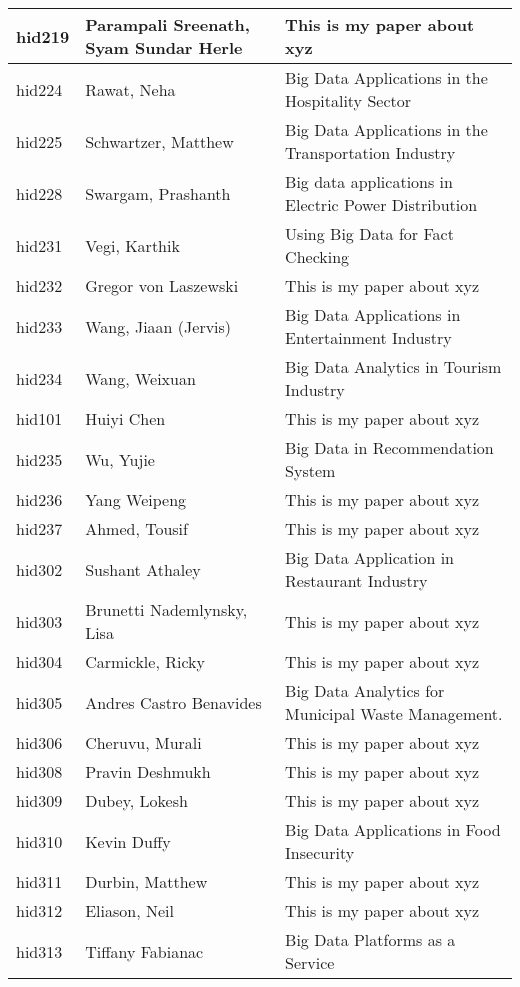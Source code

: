 \documentclass[12pt]{article}
\begin{document}
\begin{footnotesize}
\begin{longtable}{|p{1cm}p{5cm}p{9cm}|}
\hline
hid219 & Parampali Sreenath, Syam Sundar Herle & This is my paper about xyz  \\
\hline
hid224 & Rawat, Neha & Big Data Applications in the Hospitality Sector  \\
\hline
hid225 & Schwartzer, Matthew & Big Data Applications in the Transportation Industry  \\
\hline
hid228 & Swargam, Prashanth & Big data applications in Electric Power Distribution  \\
\hline
hid231 & Vegi, Karthik & Using Big Data for Fact Checking  \\
\hline
hid232 & Gregor von Laszewski & This is my paper about xyz  \\
\hline
hid233 & Wang, Jiaan (Jervis) & Big Data Applications in Entertainment Industry  \\
\hline
hid234 & Wang, Weixuan & Big Data Analytics in Tourism Industry  \\
\hline
hid101 & Huiyi Chen & This is my paper about xyz  \\
\hline
hid235 & Wu, Yujie & Big Data in Recommendation System  \\
\hline
hid236 & Yang Weipeng & This is my paper about xyz  \\
\hline
hid237 & Ahmed, Tousif & This is my paper about xyz  \\
\hline
hid302 & Sushant Athaley & Big Data Application in Restaurant Industry  \\
\hline
hid303 & Brunetti Nademlynsky, Lisa & This is my paper about xyz  \\
\hline
hid304 & Carmickle, Ricky & This is my paper about xyz  \\
\hline
hid305 & Andres Castro Benavides & Big Data Analytics for Municipal Waste Management.  \\
\hline
hid306 & Cheruvu, Murali & This is my paper about xyz  \\
\hline
hid308 & Pravin Deshmukh & This is my paper about xyz  \\
\hline
hid309 & Dubey, Lokesh & This is my paper about xyz  \\
\hline
hid310 & Kevin Duffy & Big Data Applications in Food Insecurity  \\
\hline
hid311 & Durbin, Matthew & This is my paper about xyz  \\
\hline
hid312 & Eliason, Neil & This is my paper about xyz  \\
\hline
hid313 & Tiffany Fabianac & Big Data Platforms as a Service  \\

\end{longtable}
\end{footnotesize}
\end{document}

